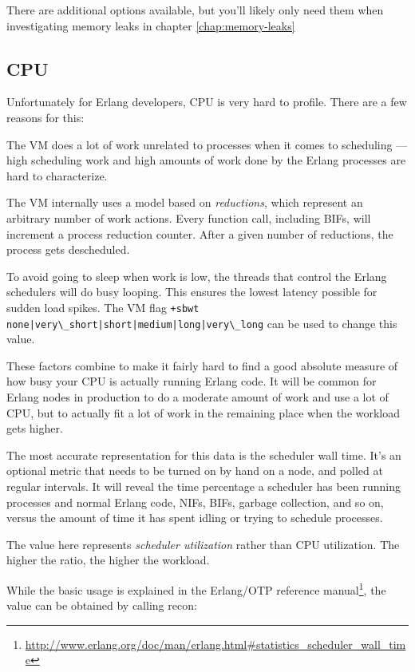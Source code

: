 \documentclass[11pt, oneside]{book}   	%
\newcommand{\command}[1]{\Verb`#1`}
\begin{document}
There are additional options available, but you'll likely only need them when investigating memory leaks in chapter \ref{chap:memory-leaks}

\subsection{CPU}
\label{subsec:global-cpu}

Unfortunately for Erlang developers, CPU is very hard to profile. There are a few reasons for this:

\begin{itemize*}
	\item The VM does a lot of work unrelated to processes when it comes to scheduling — high scheduling work and high amounts of work done by the Erlang processes are hard to characterize.
	\item The VM internally uses a model based on \emph{reductions}, which represent an arbitrary number of work actions. Every function call, including BIFs, will increment a process reduction counter. After a given number of reductions, the process gets descheduled.
	\item To avoid going to sleep when work is low, the threads that control the Erlang schedulers will do busy looping. This ensures the lowest latency possible for sudden load spikes. The VM flag \command{+sbwt none|very\_short|short|medium|long|very\_long} can be used to change this value.
\end{itemize*}

These factors combine to make it fairly hard to find a good absolute measure of how busy your CPU is actually running Erlang code. It will be common for Erlang nodes in production to do a moderate amount of work and use a lot of CPU, but to actually fit a lot of work in the remaining place when the workload gets higher.

The most accurate representation for this data is the scheduler wall time. It's an optional metric that needs to be turned on by hand on a node, and polled at regular intervals. It will reveal the time percentage a scheduler has been running processes and normal Erlang code, NIFs, BIFs, garbage collection, and so on, versus the amount of time it has spent idling or trying to schedule processes.

The value here represents \emph{scheduler utilization} rather than CPU utilization. The higher the ratio, the higher the workload.

While the basic usage is explained in the Erlang/OTP reference manual\footnote{\href{http://www.erlang.org/doc/man/erlang.html\#statistics\_scheduler\_wall\_time}{http://www.erlang.org/doc/man/erlang.html\#statistics\_scheduler\_wall\_time}}, the value can be obtained by calling recon:
\end{document}
